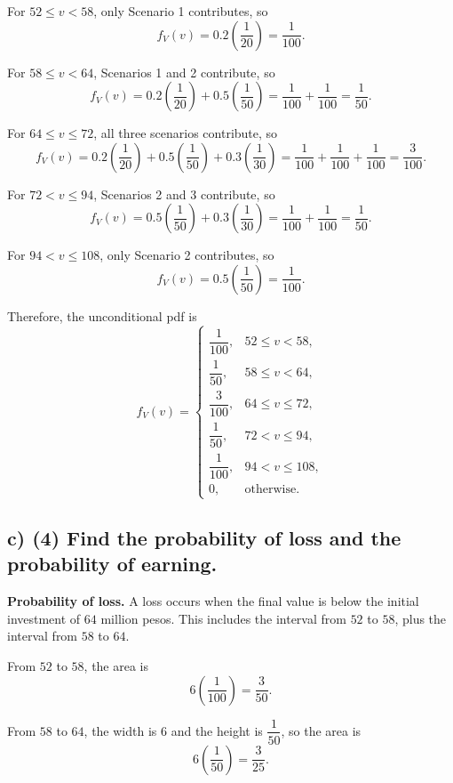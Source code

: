 For $52\le v<58$, only Scenario 1 contributes, so
\[
f_V(v)=0.2\left(\frac{1}{20}\right)=\frac{1}{100}.
\]

For $58\le v<64$, Scenarios 1 and 2 contribute, so
\[
f_V(v)=0.2\left(\frac{1}{20}\right)+0.5\left(\frac{1}{50}\right)
=\frac{1}{100}+\frac{1}{100}
=\frac{1}{50}.
\]

For $64\le v\le 72$, all three scenarios contribute, so
\[
f_V(v)=0.2\left(\frac{1}{20}\right)+0.5\left(\frac{1}{50}\right)+0.3\left(\frac{1}{30}\right)
=\frac{1}{100}+\frac{1}{100}+\frac{1}{100}
=\frac{3}{100}.
\]

For $72<v\le 94$, Scenarios 2 and 3 contribute, so
\[
f_V(v)=0.5\left(\frac{1}{50}\right)+0.3\left(\frac{1}{30}\right)
=\frac{1}{100}+\frac{1}{100}
=\frac{1}{50}.
\]

For $94<v\le 108$, only Scenario 2 contributes, so
\[
f_V(v)=0.5\left(\frac{1}{50}\right)=\frac{1}{100}.
\]

Therefore, the unconditional pdf is
\[
f_V(v)=
\begin{cases}
	\dfrac{1}{100}, & 52\le v<58,\\[6pt]
	\dfrac{1}{50}, & 58\le v<64,\\[6pt]
	\dfrac{3}{100}, & 64\le v\le 72,\\[6pt]
	\dfrac{1}{50}, & 72<v\le 94,\\[6pt]
	\dfrac{1}{100}, & 94<v\le 108,\\[6pt]
	0, & \text{otherwise.}
\end{cases}
\]



\subsection*{c) \textbf{(4)} Find the probability of loss and the probability of earning.}
\label{subsec:three-scenario-inventory-investment-c2-c}
\textbf{Probability of loss.} A loss occurs when the final value is below the initial investment of $64$ million pesos. This includes the interval from $52$ to $58$, plus the interval from $58$ to $64$.

From $52$ to $58$, the area is
\[
6\left(\frac{1}{100}\right)=\frac{3}{50}.
\]

From $58$ to $64$, the width is $6$ and the height is $\dfrac{1}{50}$, so the area is
\[
6\left(\frac{1}{50}\right)=\frac{3}{25}.
\]

